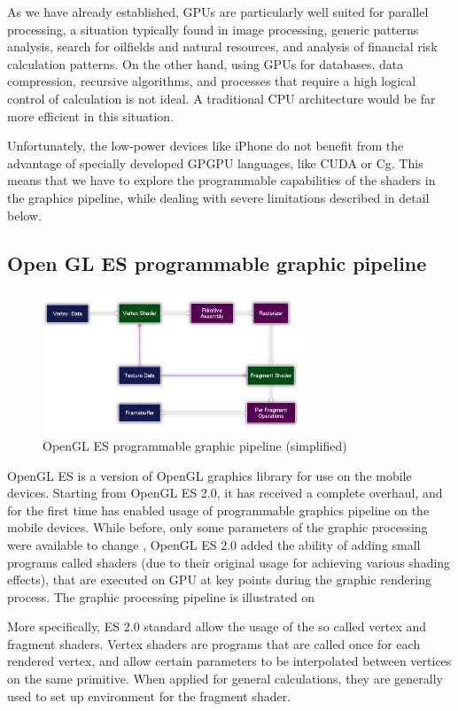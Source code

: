 As we have already established, GPUs are particularly well suited for parallel processing, a situation typically found in  image processing, generic patterns analysis, search for oilfields and natural resources, and analysis of financial risk calculation patterns. On the other hand, using GPUs for databases, data compression, recursive algorithms, and processes that require a high logical control of calculation is not ideal. A traditional CPU architecture would be far more efficient in this situation.

Unfortunately,  the low-power devices like iPhone do not benefit from the advantage of specially developed GPGPU languages, like CUDA or Cg. This means that we have to explore the programmable capabilities of the shaders in the graphics pipeline, while dealing with severe limitations described in detail below. 

\subsection{Open GL ES programmable graphic pipeline}
\begin{figure}[t]
		\centering
		\includegraphics[width=0.7\textwidth]{glespipe}
		\caption{OpenGL ES programmable graphic pipeline (simplified)}
		\label{pipe}
	\end{figure}
OpenGL ES is a version of OpenGL graphics library for use on the mobile devices. Starting from OpenGL ES 2.0, it has received a complete overhaul, and for the first time has enabled usage of programmable graphics pipeline on the mobile devices.  While before, only some parameters of the graphic processing were available to change , OpenGL ES 2.0 added the ability of adding small programs called shaders (due to their original usage for achieving various shading effects), that are executed on GPU at key points during the graphic rendering process. The graphic processing pipeline is illustrated on 

More specifically, ES 2.0 standard allow the usage of the so called vertex and fragment shaders. Vertex shaders are programs that are called once for each rendered vertex, and allow certain parameters to be interpolated between vertices on the same primitive. When applied for general calculations, they are generally used to set up environment for the fragment shader.

